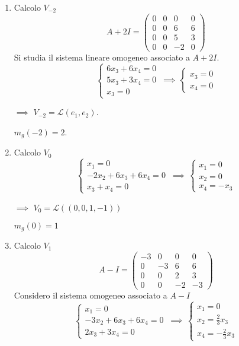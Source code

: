 {    \begin{enumerate}
        \item Calcolo $ V_{-2} $\[
            A+2I=\begin{pmatrix}
                0 & 0 & 0 & 0\\
                0 & 0 & 6 & 6\\
                0 & 0 & 5 & 3\\
                0 & 0 & -2 & 0
            \end{pmatrix}
        \]
        Si studia il sistema lineare omogeneo associato a $ A+2I $.
        \[
            \begin{cases}
                6x_3+6x_4=0\\
                5x_3+3x_4=0\\
                x_3=0
            \end{cases} \,\implies\, \begin{cases}
                x_3=0\\
                x_4=0
            \end{cases}
        \] 
        
        $\implies$ $ V_{-2}= \mathscr{L}(e_1, e_2)  $. 
        
        $ m_{g}(-2)=2  $.
        \item Calcolo $ V_0 $\[
            \begin{cases}
                x_1=0\\
                -2x_2+6x_3+6x_4=0\\
                x_3+x_4=0
            \end{cases} \,\implies\, \begin{cases}
                x_1=0\\
                x_2=0\\
                x_4=-x_3
            \end{cases}
        \] 
        
        $\implies$ $ V_0= \mathscr{L}((0, 0, 1, -1)) $

        $ m_{g}(0)=1  $
        \item Calcolo $ V_1 $ \[
            A-I=\begin{pmatrix}
                -3 & 0 & 0 & 0\\
                0 & -3 & 6 & 6\\
                0 & 0 & 2 & 3\\
                0 & 0 & -2 & -3
            \end{pmatrix}
        \]
        Considero il sistema omogeneo associato a $ A-I $ \[
            \begin{cases}
                x_1=0\\
                -3x_2+6x_3+6x_4=0\\
                2x_3+3x_4=0
            \end{cases} \,\implies\, \begin{cases}
                x_1=0\\
                x_2=\frac{2}{3}x_3\\
                x_4=-\frac{2}{3}x_3
            \end{cases}
        \] 
        

\end{enumerate}}
